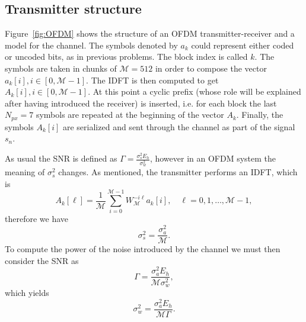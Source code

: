 \documentclass[10pt]{article}
\newcommand{\ofdM} {\mathcal{M}}
\begin{document}
\subsection*{Transmitter structure}
Figure~\ref{fig:OFDM} shows the structure of an OFDM transmitter-receiver and a model for the channel. The symbols denoted by $a_k$ could represent either coded or uncoded bits, as in previous problems. The block index is called $k$. The symbols are taken in chunks of $\ofdM = 512$ in order to compose the vector $a_k[i], i \in [0, \ofdM - 1]$. The IDFT is then computed to get $A_k[i], i\in [0, \ofdM-1]$. At this point a cyclic prefix (whose role will be explained after having introduced the receiver) is inserted, i.e. for each block the last $N_{px} = 7$ symbols are repeated at the beginning of the vector $A_k$. Finally, the symbols $A_k[i]$ are serialized and sent through the channel as part of the signal $s_n$.

As usual the SNR is defined as $\Gamma = \frac{\sigma_s^2 E_h}{\sigma_w^2}$, however in an OFDM system the meaning of $\sigma_s^2$ changes. As mentioned, the transmitter performs an IDFT, which is
\begin{equation}
	A_k[\ell] = \frac{1}{\ofdM} \sum_{i = 0}^{\ofdM - 1} W_{\ofdM}^{-i\ell} a_k[i], \quad \ell = 0, 1, \dots, \ofdM-1,
\end{equation}
therefore we have 
\begin{equation}
	\sigma_s^2 = \dfrac{\sigma_a^2}{\ofdM}.
\end{equation}
To compute the power of the noise introduced by the channel we must then consider the SNR as
\begin{equation}
	\Gamma = \dfrac{\sigma_a^2 E_h}{\ofdM \sigma_w^2},
	\label{eq:snrOFDM}
\end{equation}
which yields
\begin{equation}
	\sigma_w^2 = \dfrac{\sigma_a^2 E_h}{\ofdM \Gamma}.
\end{equation}
\end{document}
